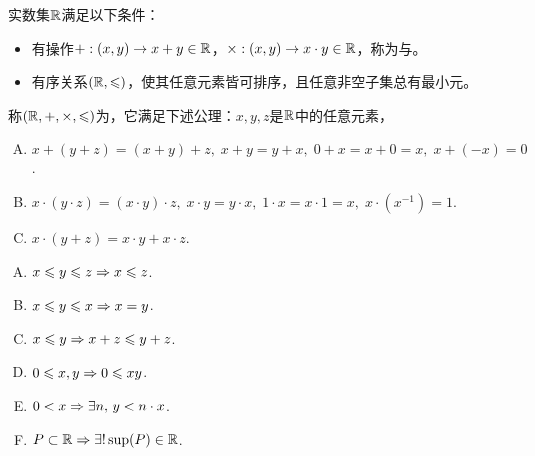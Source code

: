 \begin{definition}
	
	实数集$\mathbb{R}$满足以下条件：
	
	\begin{itemize}
		
		\item 有操作$+:(x,y)\rightarrow x+y\in\mathbb{R}$，$\times:(x,y)\rightarrow x\cdot y\in\mathbb{R}$，称为与。
		
		\item 有序关系$(\mathbb{R},\leqslant)$，使其任意元素皆可排序，且任意非空子集总有最小元。
		
	\end{itemize}
	
	称$(\mathbb{R},+,\times,\leqslant)$为，它满足下述公理：$x,y,z$是$\mathbb{R}$中的任意元素，
	
	\begin{enumerate}[F.1]
		
		\item $x+(y+z)=(x+y)+z,\; x+y=y+x,\; 0+x=x+0=x,\; x+(-x)=0$.
		
		\item $x\cdot(y\cdot z)=(x\cdot y)\cdot z,\; x\cdot y=y\cdot x,\; 1\cdot x=x\cdot 1=x,\; x\cdot (x^{-1})=1$.
		
		\item $x\cdot(y+z)=x\cdot y+x\cdot z$.
		
	\end{enumerate}
	
	\begin{enumerate}[O.1]
		
		\item $x\leqslant y\leqslant z \Rightarrow x\leqslant z$.
		
		\item $x\leqslant y\leqslant x \Rightarrow x = y$.
		
		\item $x\leqslant y \Rightarrow x+z\leqslant y+z$.
		
		\item $0\leqslant x,y \Rightarrow 0\leqslant xy$.
		
		\item $0<x \Rightarrow \exists n,\, y<n\cdot x$.
		
		\item $P\subset \mathbb{R} \Rightarrow \exists! \sup(P)\in\mathbb{R}$.
		
	\end{enumerate}
	
\end{definition}

